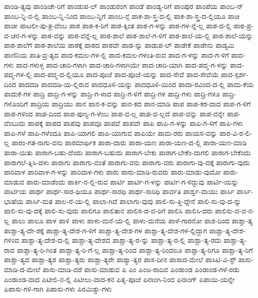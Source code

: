 {ಪಾಂಡಿ-ತ್ಯವು
ಪಾಂಡಿಚೇ-ರಿಗೆ
ಪಾಂಡುಪ-ಲ್
ಪಾಂಡುರಂಗ
ಪಾಂಡೆ
ಪಾಂಡ್ಯ-ರಿಗೆ
ಪಾಂಪುರ
ಪಾಂಪೆಯ
ಪಾಂಬ-ನ್
ಪಾಂಬ-ನ್ನಿ-ನ-ಲ್ಲಿ
ಪಾಂಬ-ನ್ನಿ-ನಿಂದ
ಪಾಂಬ-ನ್ನಿಗೆ
ಪಾಂಬ-ನ್ಗೆ
ಪಾಕ-ಶಾ-ಸ್ತ್ರ-ದ-ಲ್ಲಿ
ಪಾಕ-ಶಾ-ಸ್ತ್ರ-ದ-ಲ್ಲಿಯೂ
ಪಾಚಿ
ಪಾಚೀ
ಪಾಟಲೀ-ಪು-ತ್ರ-ವೆಂಬ
ಪಾಠ
ಪಾಠ-ಕ-ರಿಗೆ
ಪಾಠ-ಕ್ಕಿಂತ
ಪಾಠ-ಗ-ಳನ್ನು
ಪಾಠ-ಗಳ-ನ್ನೆ-ಲ್ಲ
ಪಾಠ-ದ-ಲ್ಲಿ
ಪಾಠ-ಪ್ರ-ವ-ಚನ-ಗ-ಳನ್ನು
ಪಾಠ-ವನ್ನು
ಪಾಠ-ವನ್ನೆ-ಲ್ಲ
ಪಾಠ-ಶಾಲೆ
ಪಾಠ-ಶಾಲೆ-ಗ-ಳಿಗೆ
ಪಾಠ-ಶಾಲೆ-ಯ-ಲ್ಲಿ
ಪಾಠ-ಶಾಲೆ-ಯನ್ನು
ಪಾಠ-ಶಾಲೆಗೆ
ಪಾಠ-ಶಾಲೆಯ
ಪಾಠಕ್ಕೆ
ಪಾಠದ
ಪಾಠವೇ
ಪಾಡ-ನ್ನು
ಪಾಡುಪ-ಲ್
ಪಾಡೇಕೆ
ಪಾಡೇನು
ಪಾಡ್ಯಮಿ
ಪಾಣಿನಿಯ
ಪಾತಿ-ವ್ರ-ತ್ಯದ
ಪಾದ-ಕಮಲ-ಗಳ-ಲ್ಲಿ
ಪಾದ-ಕಮಲ-ಗಳಂತಿ-ರುವ
ಪಾದ-ಗ-ಳನ್ನು
ಪಾದ-ಗ-ಳಿಗೆ
ಪಾದ-ಗಳು
ಪಾದ-ಗಳುಳ್ಳ
ಪಾದ-ಚಾರಿ-ಗಳಾಗಿ
ಪಾದ-ಚಾರಿ-ಗಳಾಗಿಯೇ
ಪಾದ-ಚಾರಿ-ಯಾಗಿ
ಪಾದ-ಪದ್ಮ-ಗ-ಳನ್ನು
ಪಾದ-ಪದ್ಮ-ಗಳ-ಲ್ಲಿ
ಪಾದ-ಪದ್ಮ-ದ-ಲ್ಲಿಯೂ
ಪಾದ-ಪೂಜೆ
ಪಾದ-ಪೂಜೆ-ಯನ್ನು
ಪಾದ-ಸೇವೆ
ಪಾದ-ಸೇವೆಯೆ
ಪಾದ-ಸ್ಪರ್ಶ-ದಿಂದ
ಪಾದದಡಿ
ಪಾದದಡಿ-ಯ-ಲ್ಲಿರುವ
ಪಾದಧೂಳಿ-ಯನ್ನು
ಪಾದಧೂಳಿ-ಯಿಂದ
ಪಾದಾ-ರವಿಂದ-ದ-ಲ್ಲಿ
ಪಾದು-ಕೆಯ
ಪಾದುಕೆ-ಗಳ
ಪಾದ್ರಿ
ಪಾದ್ರಿ-ಗ-ಳನ್ನು
ಪಾದ್ರಿ-ಗ-ಳಾದ
ಪಾದ್ರಿ-ಗ-ಳಿಗೆ
ಪಾದ್ರಿ-ಗಳ
ಪಾದ್ರಿ-ಗಳು
ಪಾದ್ರಿ-ಗಳೂ
ಪಾದ್ರಿ-ಗಳೊಂದಿಗೆ
ಪಾದ್ರಿಯ
ಪಾದ್ರಿಯು
ಪಾನ
ಪಾನ-ಕ-ವನ್ನು
ಪಾನ-ಕದ
ಪಾನ-ಮಾಡಿ
ಪಾಪ
ಪಾಪ-ಕರ-ವಾದ
ಪಾಪ-ಗ-ಳಿಗೆ
ಪಾಪ-ಗಳಿಂದ
ಪಾಪ-ದಿಂದ
ಪಾಪ-ಪುಣ್ಯ-ಗ-ಳೆಂಬ
ಪಾಪ-ವ-ಲ್ಲ
ಪಾಪ-ವ-ಲ್ಲದೆ
ಪಾಪ-ವನ್ನು
ಪಾಪ-ವನ್ನೇ
ಪಾಪ-ವೆಂಬುದು
ಪಾಪಕ್ಕೆ
ಪಾಪದ
ಪಾಪವು
ಪಾಪವೂ
ಪಾಪವೆ
ಪಾಪವೇ
ಪಾಪಿ
ಪಾಪಿ-ಗ-ಳನ್ನು
ಪಾಪಿ-ಗ-ಳಿಗೆ
ಪಾಪಿ-ಗಳು
ಪಾಪಿ-ಗಳೆ
ಪಾಪಿ-ಗಳೆಂದೂ
ಪಾಪಿ-ಯಾಗಲಿ
ಪಾಪಿ-ಯಾಗುವ
ಪಾಪಿಯೇ
ಪಾಮ-ರರು
ಪಾಯಸ-ವನ್ನು
ಪಾರ-ವಿ-ರ-ಲಿ-ಲ್ಲ
ಪಾರಂ-ಗತ-ನಾಗು-ವನು
ಪಾರಮಾರ್ಥಿಕ
ಪಾರಾ-ದಾರು
ಪಾರಾ-ಯಣ
ಪಾರಾ-ಯಣ-ದ-ಲ್ಲಿ
ಪಾರಾ-ಯಣ-ಮಾಡಿ
ಪಾರಾ-ಯಿತು
ಪಾರಾಗ-ಬಹು-ದೆಂದು
ಪಾರಾಗ-ಬಹುದು
ಪಾರಾಗ-ಬೇಕು
ಪಾರಾಗ-ಬೇಕೆಂ-ದಾಗಲಿ
ಪಾರಾಗ-ಬೇಕೆಂದು
ಪಾರಾಗಲೆ-ತ್ನಿಸಿ-ದಳು
ಪಾರಾಗು
ಪಾರಾಗು-ವಂತೆ
ಪಾರಾಗು-ವನು
ಪಾರಾಗು-ವರು
ಪಾರಾಗು-ವು-ದಕ್ಕೆ
ಪಾರಾಗು-ವುದು
ಪಾರಿವಾಳ
ಪಾರಿವಾಳ-ಗ-ಳನ್ನು
ಪಾರಿವಾಳ-ಗಳು
ಪಾರು
ಪಾರು-ಮಾಡಿ-ರುವರು
ಪಾರು-ಮಾಡು-ವುದೋ
ಪಾರು-ಮಾಡುವ
ಪಾರು-ಮಾಡೆಂದು
ಪಾರ್ಕಿ-ನ-ಲ್ಲಿ-ರುವ
ಪಾರ್ಟಿ
ಪಾರ್ಟಿ-ಗ-ಳನ್ನು
ಪಾರ್ಟಿ-ಗ-ಳಿದ್ದುವು
ಪಾರ್ಟಿ-ಯನ್ನು
ಪಾರ್ಟಿಯ
ಪಾರ್ಥ
ಪಾರ್ಥ-ಸಾರ-ಥಿಯೂ
ಪಾರ್ಥ-ಸಾರಥಿ
ಪಾರ್ಥ-ಸಾರಿಥಿ
ಪಾರ್ವತಿ
ಪಾರ್ಶ್ವ-ವಾಯು
ಪಾರ್ಸಿ
ಪಾರ್ಸಿ-ಭಾಷೆಯ
ಪಾರ್ಸಿ-ಮತ
ಪಾಲ-ನೆ-ಯ-ಲ್ಲಿ
ಪಾಲಾ-ಗಿದೆ
ಪಾಲಾಗು-ವುವು
ಪಾಲಿ-ಸು-ತ್ತಿ-ದ್ದೇನೆ
ಪಾಲಿ-ಸು-ವು-ದ-ನ್ನು
ಪಾಲಿ-ಸು-ವು-ದಕ್ಕೆ
ಪಾಲಿ-ಸು-ವುದು
ಪಾಲಿಗೂ
ಪಾಲಿತಾನ
ಪಾಲಿಸ-ದ-ವ-ರಿಗೆ
ಪಾಲಿಸಿ
ಪಾಲಿಸಿ-ದರು
ಪಾಲಿಸು-ವ-ವ-ನ-ಲ್ಲ
ಪಾಲು
ಪಾಲೂ
ಪಾಳ
ಪಾಳಿ
ಪಾಳು
ಪಾಳು-ಮನೆ-ಯ-ಲ್ಲಿ
ಪಾಳು-ಮನೆಯ
ಪಾಳೆ-ಗಾರನೋ
ಪಾಶ-ದಿಂದ
ಪಾಶ್ಚಾ-ತ್ಯ
ಪಾಶ್ಚಾ-ತ್ಯ-ದೇ-ಶಕ್ಕೆ
ಪಾಶ್ಚಾ-ತ್ಯ-ದೇಶ-ಗ-ಳಿಗೆ
ಪಾಶ್ಚಾ-ತ್ಯ-ದೇಶ-ಗಳ
ಪಾಶ್ಚಾ-ತ್ಯ-ದೇಶ-ಗಳ-ಲ್ಲಿದ್ದಾಗ
ಪಾಶ್ಚಾ-ತ್ಯ-ದೇಶ-ಗಳಿಂದ
ಪಾಶ್ಚಾ-ತ್ಯ-ದೇಶ-ದ-ಲ್ಲಿ
ಪಾಶ್ಚಾ-ತ್ಯ-ದೇಶದ
ಪಾಶ್ಚಾ-ತ್ಯ-ರ-ನ್ನು
ಪಾಶ್ಚಾ-ತ್ಯ-ರ-ಲ್ಲಿ
ಪಾಶ್ಚಾ-ತ್ಯ-ರದು
ಪಾಶ್ಚಾ-ತ್ಯ-ರಾದ
ಪಾಶ್ಚಾ-ತ್ಯ-ರಿ-ಗಿಂತ
ಪಾಶ್ಚಾ-ತ್ಯ-ರಿ-ಗೆ-ಲ್ಲ
ಪಾಶ್ಚಾ-ತ್ಯ-ರಿಂದ
ಪಾಶ್ಚಾ-ತ್ಯ-ರಿಂದಲೂ
ಪಾಶ್ಚಾ-ತ್ಯ-ರಿಗೂ
ಪಾಶ್ಚಾ-ತ್ಯ-ರಿಗೆ
ಪಾಶ್ಚಾ-ತ್ಯದ
ಪಾಶ್ಚಾ-ತ್ಯರ
ಪಾಶ್ಚಾ-ತ್ಯರು
ಪಾಶ್ಚಾ-ತ್ಯರೇ
ಪಾಶ್ಯಾ-ತ್ಯರ
ಪಾಸ-ದೀನ
ಪಾಸಾದ-ಮೇಲೆ
ಪಾಸಿಟಿ-ವಿ-ಸ್ಟ್
ಪಾಸು-ಮಾಡಿ-ದ-ಮೇಲೆ
ಪಾಸು-ಮಾಡಿ-ದರೆ
ಪಾಸು-ಮಾಡುವ
ಪಿ
ಪಿಂ
ಪಿಂಜ-ರಾದಿವ
ಪಿಂಡಾಂಡ
ಪಿಂಡಾಂಡ-ಗಳೆ-ರಡು
ಪಿಂಡಾಂಡ-ವಾದ
ಪಿಟೀಲಿ-ನ-ಲ್ಲಿ
ಪಿಟೀಲು-ವಾದ-ಕನ
ಪಿತೃ-ಪೂಜೆ
ಪಿನಾಂಗಿ-ನಿಂದ
ಪಿನಾಂಗ್
ಪಿಪಾಯಿ-ಯನ್ನೇ
ಪಿಪಾಸು-ಗಳಿ-ಗಾಗಿ
ಪಿಪಾಸು-ಗಳು
ಪಿರಮಿಡ್ಡು-ಗಳು
}

